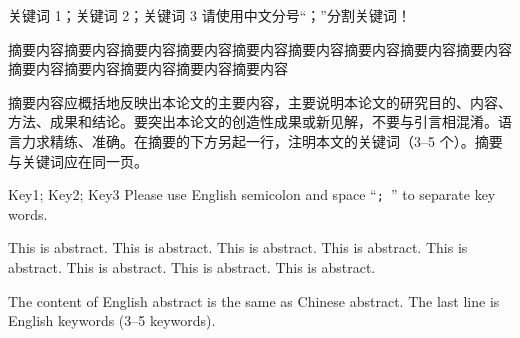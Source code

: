 
\begin{cnabstract}{关键词 1；关键词 2；关键词 3}
  请使用中文分号“；”分割关键词！

  摘要内容摘要内容摘要内容摘要内容摘要内容摘要内容摘要内容摘要内容摘要内容摘要内容摘要内容摘要内容摘要内容摘要内容

  摘要内容应概括地反映出本论文的主要内容，主要说明本论文的研究目的、内容、方法、成果和结论。要突出本论文的创造性成果或新见解，不要与引言相混淆。语言力求精练、准确。在摘要的下方另起一行，注明本文的关键词（3--5 个）。摘要与关键词应在同一页。
\end{cnabstract}


\begin{enabstract}{Key1; Key2; Key3}
  Please use English semicolon and space ``\verb*|; |'' to separate key words.

  This is abstract. This is abstract. This is abstract. This is abstract. This is abstract. This is abstract. This is abstract. This is abstract.

  The content of English abstract is the same as Chinese abstract. The last line is English keywords (3--5 keywords).
\end{enabstract}
